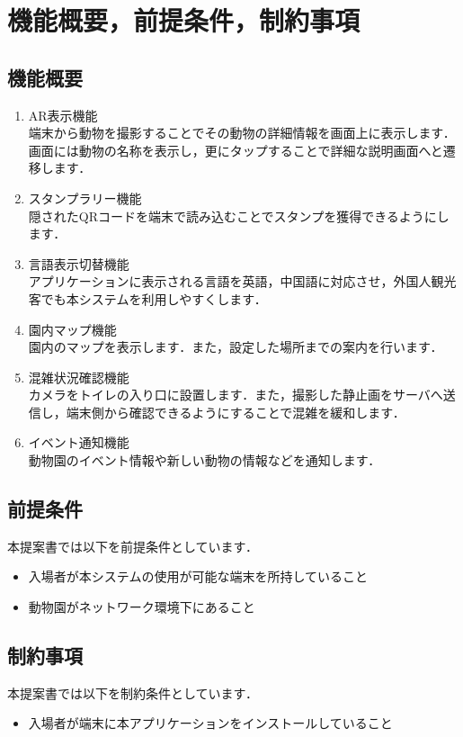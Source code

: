 \documentclass[a4j]{jarticle}
\begin{document}
\section{機能概要，前提条件，制約事項}

\subsection{機能概要}
\begin{enumerate}
	\item AR表示機能\\
	端末から動物を撮影することでその動物の詳細情報を画面上に表示します．画面には動物の名称を表示し，更にタップすることで詳細な説明画面へと遷移します．
	\item スタンプラリー機能\\
	隠されたQRコードを端末で読み込むことでスタンプを獲得できるようにします．
	\item 言語表示切替機能\\
	アプリケーションに表示される言語を英語，中国語に対応させ，外国人観光客でも本システムを利用しやすくします．
	\item 園内マップ機能\\
	園内のマップを表示します．また，設定した場所までの案内を行います．
	\item 混雑状況確認機能\\
	カメラをトイレの入り口に設置します．また，撮影した静止画をサーバへ送信し，端末側から確認できるようにすることで混雑を緩和します．
	\item イベント通知機能\\
	動物園のイベント情報や新しい動物の情報などを通知します．
\end{enumerate}

\subsection{前提条件}
本提案書では以下を前提条件としています．
\begin{itemize}
	\item 入場者が本システムの使用が可能な端末を所持していること
	\item 動物園がネットワーク環境下にあること
\end{itemize}

\subsection{制約事項}
本提案書では以下を制約条件としています．
\begin{itemize}
	\item 入場者が端末に本アプリケーションをインストールしていること
\end{itemize}
\end{document}
